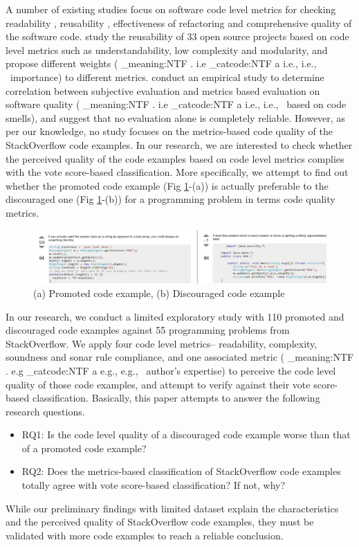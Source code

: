 \documentclass{sig-alternate}
\makeatletter
\newcommand\latinabbrev[1]{
  \peek_meaning:NTF . {%
    #1\@}%
  { \peek_catcode:NTF a {%
      #1., \@ }%
    {#1., \@}}}
\def\eg{\latinabbrev{e.g}}
\def\ie{\latinabbrev{i.e}}
\makeatother
\begin{document}
A number of existing studies focus on software code level metrics for checking readability \cite{readability, simpler}, reusability \cite{reusability}, effectiveness of refactoring \cite{refactoring} and comprehensive quality \cite{ijert, lochmann, survey, foss, oss} of the software code. \citet{reusability} study the reusability of 33 open source projects based on code level metrics such as understandability, low complexity and modularity, and propose different weights (\ie\ importance) to different metrics. \citet{subjective} conduct an empirical study to determine correlation between subjective evaluation and metrics based evaluation on software quality (\ie\ based on code smells), and suggest that no evaluation alone is completely reliable. However, as per our knowledge, no study focuses on the metrics-based code quality of the StackOverflow code examples. In our research, we are interested to check whether the perceived quality of the code examples based on code level metrics complies with the vote score-based classification. More specifically, we attempt to find out whether the promoted code example (Fig \ref{fig:example}-(a)) is actually preferable to the discouraged one (Fig \ref{fig:example}-(b)) for a programming problem in terms code quality metrics.
\begin{figure}[!t]
\centering
\includegraphics[width=7in ]{whole23}
\caption{(a) Promoted code example, (b) Discouraged code example}
\label{fig:example}
\end{figure}

In our research, we conduct a limited exploratory study with 110 promoted and discouraged code examples against 55 programming problems from StackOverflow. We apply four code level metrics-- readability, complexity, soundness and sonar rule compliance, and one associated metric (\eg\ author's expertise) to perceive the code level quality of those code examples, and attempt to verify against their vote score-based classification. Basically, this paper attempts to answer the following research questions.
\begin{itemize}
\item RQ1: Is the code level quality of a discouraged code example worse than that of a promoted code example?
\item RQ2: Does the metrics-based classification of StackOverflow code examples totally agree with vote score-based classification? If not, why?
\end{itemize}
While our preliminary findings with limited dataset explain the characteristics and the perceived quality of StackOverflow code examples, they must be validated with more code examples to reach a reliable conclusion.
\end{document}
